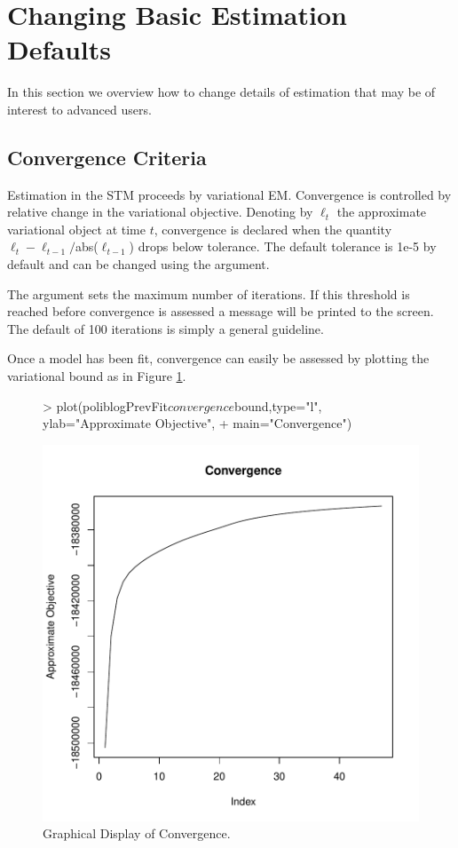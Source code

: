 \documentclass[nojss]{jss}
\begin{document}
\section{Changing Basic Estimation Defaults}
In this section we overview how to change details of estimation that may be of interest to advanced users.

\subsection{Convergence Criteria}
Estimation in the STM proceeds by variational EM.  Convergence is controlled by relative change in the variational objective.  Denoting by $\ell_t$ the approximate variational object at time $t$, convergence is declared when the quantity $\ell_t - \ell_{t-1}/$abs($\ell_{t-1}$) drops below tolerance.  The default tolerance is 1e-5 by default and can be changed using the  argument.

The argument  sets the maximum number of iterations.  If this threshold is reached before convergence is assessed a message will be printed to the screen.  The default of 100 iterations is simply a general guideline.

Once a model has been fit, convergence can easily be assessed by plotting the variational bound as in Figure \ref{fig:converge}.

\begin{figure}[t!]
\begin{center}
\begin{Schunk}
\begin{Sinput}
> plot(poliblogPrevFit$convergence$bound,type="l", ylab="Approximate Objective",
+     main="Convergence")
\end{Sinput}
\end{Schunk}
\includegraphics{stmVignette-023}
\caption{Graphical Display of Convergence.}
\label{fig:converge}
\end{center}
\end{figure}
\end{document}
